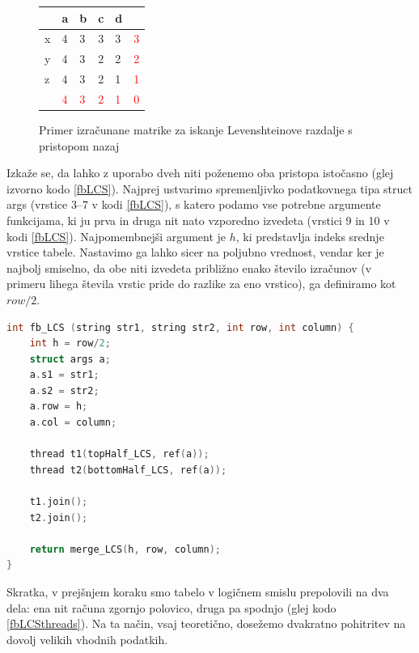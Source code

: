 \documentclass[a4paper,12pt,openright]{book}
\begin{document}
\begin{figure}[htb]
\centering
\begin{tabular}{|l|l|l|l|l|l|}
\cline{2-5}
  \multicolumn{1}{c|}{}  & a & b & c & d\\ \hline
x & \cellcolor{blue!25}4 & \cellcolor{blue!15}3 & 3 & 3 & \textcolor{red}{3}\\ \hline
y  & 4 & 3 &  \cellcolor{blue!15}2 & 2 & \textcolor{red}{2}\\ \hline
z  & 4 & 3 & 2 & \cellcolor{blue!15}1 & \textcolor{red}{1} \\ \hline
\multicolumn{1}{c|}{}  & \textcolor{red}{4} & \textcolor{red}{3} & \textcolor{red}{2} & \textcolor{red}{1} & \textcolor{red}{0} \\ \cline{2-6}
\end{tabular}
\caption{Primer izračunane matrike za iskanje Levenshteinove razdalje s pristopom nazaj}
\label{levenshteinBackwardExample}
\end{figure}

Izkaže se, da lahko z uporabo dveh niti poženemo oba pristopa istočasno (glej izvorno kodo \ref{fbLCS}). Najprej ustvarimo spremenljivko podatkovnega tipa struct args (vrstice 3--7 v kodi \ref{fbLCS}), s katero podamo vse potrebne argumente funkcijama, ki ju prva in druga nit nato vzporedno izvedeta (vrstici 9 in 10 v kodi \ref{fbLCS}). Najpomembnejši argument je $h$, ki predstavlja indeks srednje vrstice tabele. Nastavimo ga lahko sicer na poljubno vrednost, vendar ker je najbolj smiselno, da obe niti izvedeta približno enako število izračunov (v primeru lihega števila vrstic pride do razlike za eno vrstico), ga definiramo kot $row/2$. 

\bigskip
\begin{lstlisting}[language=C++, caption={Algoritem LCS naprej-nazaj}, captionpos=b, label=fbLCS]
int fb_LCS (string str1, string str2, int row, int column) {
    int h = row/2;
    struct args a; 
    a.s1 = str1;
    a.s2 = str2;
    a.row = h;
    a.col = column;

    thread t1(topHalf_LCS, ref(a));
    thread t2(bottomHalf_LCS, ref(a));
    
    t1.join();
    t2.join();

    return merge_LCS(h, row, column);
}
\end{lstlisting}

Skratka, v prejšnjem koraku smo tabelo v logičnem smislu prepolovili na dva dela: ena nit računa zgornjo polovico, druga pa spodnjo (glej kodo \ref{fbLCSthreads}). Na ta način, vsaj teoretično, dosežemo dvakratno pohitritev na dovolj velikih vhodnih podatkih. 
\end{document}
